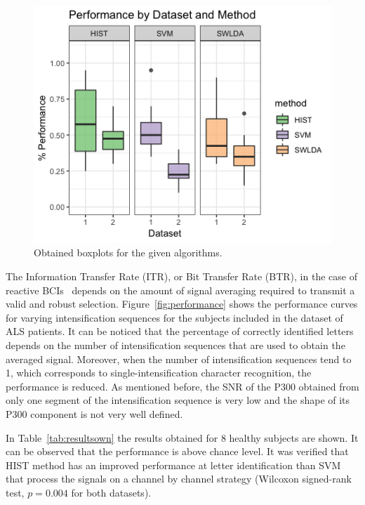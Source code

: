 \begin{figure}[h!]
\centering
\includegraphics[width=15cm]{images/boxplots.png}
\caption[P300 Classification Boxplots]{Obtained boxplots for the given algorithms.}
\label{fig:boxplots}
\end{figure}

The Information Transfer Rate (ITR), or Bit Transfer Rate (BTR), in the case of reactive BCIs~\cite{WolpawJonathanR2012}  depends on the amount of signal averaging required to transmit a valid and robust selection.  Figure~\ref{fig:performance} shows the performance curves for varying intensification sequences for the subjects included in the dataset of ALS patients. It can be noticed that the percentage of correctly identified letters depends on the number of intensification sequences that are used to obtain the averaged signal.  Moreover, when the number of intensification sequences tend to 1, which corresponds to single-intensification character recognition, the performance is reduced. As mentioned before, the SNR of the P300 obtained from only one segment of the intensification sequence is very low and the shape of its P300 component is not very well defined.

In Table~\ref{tab:resultsown} the results obtained for 8 healthy subjects are shown.  It can be observed that the performance is above chance level. It was verified that HIST method has an improved performance at letter identification than SVM that process the signals on a channel by channel strategy (Wilcoxon signed-rank test, $p =  0.004$ for both datasets).



